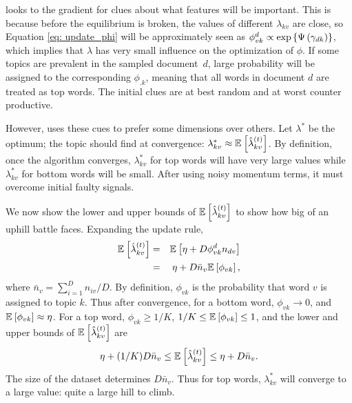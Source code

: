  looks to the gradient for clues about what features will
be important.  This is because before the equilibrium is
broken, the values of different
$\lambda_{kv}$ are close, so Equation \ref{eq: update_phi} will be
approximately seen as $\phi_{vk}^d \propto \mbox{exp}\left\{ \Psi \left( \textstyle \gamma_{dk} \right)\right\}$, which
implies that $\lambda$ has very small influence on the optimization of
$\phi$.
If some topics are prevalent in the sampled document~$d$, large probability
will be assigned to the corresponding $\phi_{.k}$, meaning that all words
in document $d$ are treated as top words.  The initial clues are at
best random and at worst counter productive.

However,  uses these cues to prefer some dimensions over
others.  Let $\lambda^*$ be the optimum; the topic  should find at
convergence: $\lambda^*_{kv} \approx \mathbb{E}_{}\left[ \hat \lambda^{(t)}_{kv} \right]$. By definition, once the algorithm
converges, $\lambda^*_{kv}$ for top words will have very large
values while $\lambda^*_{kv}$ for bottom words will be small.  After
using noisy momentum terms, it must overcome initial faulty signals.


We now show the lower and upper bounds of
$\mathbb{E}_{}\left[ \hat\lambda^{(t)}_{kv} \right]$ to show how big of an uphill battle
 faces. Expanding the update rule,
\begin{eqnarray*}
	\mathbb{E}_{}\left[ \hat \lambda^{(t)}_{kv} \right] &=& \mathbb{E}_{}\left[ \eta + D{\phi^{d} _{vk}}{n_{dv}} \right] \\
	&=& \eta + D\bar{n}_v\mathbb{E}_{}\left[ \phi_{vk} \right], \\
\end{eqnarray*}
where $\bar{n}_v = \sum_{i=1}^{D}n_{iv}/D$. By definition, $\phi_{vk}$ is the probability
that word $v$ is assigned to topic $k$. 
Thus after convergence, for a bottom word, $\phi_{vk} \to 0$, and $\mathbb{E}_{}\left[ \phi_{vk} \right] \approx \eta$. For a top word, $\phi_{vk} \ge 1 / K$, $1/ K \le \mathbb{E}_{}\left[ \phi_{vk} \right] \le 1$, and
the lower and upper bounds of $\mathbb{E}_{}\left[ \hat\lambda^{(t)}_{kv} \right]$ are
\begin{equation*}
	\eta + (1/ K)D\bar{n}_v \le	\mathbb{E}_{}\left[ \hat \lambda^{(t)}_{kv} \right] \le \eta + D\bar{n}_v.
\end{equation*}
The size of the dataset determines $D\bar{n}_v$.
Thus for top words, $\lambda^*_{kv}$ will converge to a large value:
quite a large hill to climb. 

